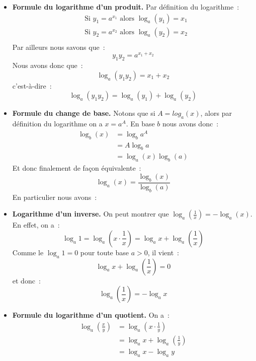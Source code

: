 \documentclass[10pt,notheorems]{beamer}
\theoremstyle{plain}
\theoremstyle{definition} %
\begin{document}
\begin{notes}

  \begin{itemize}

  \item \textbf{Formule du logarithme d'un produit.} Par définition du logarithme~:
    \begin{eqnarray*}
      &\text{Si } y_1 = a^{x_1} \text{ alors } \log_a(y_1) = x_1\\
      &\text{Si } y_2 = a^{x_2} \text{ alors } \log_a(y_2) = x_2\\
    \end{eqnarray*}
    Par ailleurs nous savons que~:
    \[
      y_1y_2 = a^{x_1+x_2}
    \]
    Nous avons donc que~:
    \[
      \log_a(y_1y_2) = x_1 + x_2
    \]
    c'est-à-dire~:
    \[
      \log_a(y_1y_2) = \log_a(y_1) + \log_a(y_2)
    \]

  \item \textbf{Formule du change de base.} Notons que si $A = log_a(x)$, alors par définition du logarithme on a $x = a^A$. En base $b$ nous avons donc~:
    \[
      \begin{split}
        \log_b(x) &= \log_b a^A\\
        &= A\log_b a\\
        &= \log_a(x)\log_b(a)
      \end{split}
    \]
    Et donc finalement de façon équivalente~:
    \[
      \log_a(x) = \frac{\log_b(x)}{\log_b(a)}
    \]
    En particulier nous avons~:

  \item \textbf{Logarithme d'un inverse.} On peut montrer que $\log_a \left(\frac{1}{x}\right) = - \log_a(x)$. En effet, on a~:
    \[
      \log_a1 = \log_a \left(x\cdot\frac{1}{x}\right) = \log_a x + \log_a \left(\frac{1}{x}\right)
    \]
    Comme le $\log_a 1 = 0$ pour toute base $a>0$, il vient~:
    \[
      \log_a x + \log_a \left(\frac{1}{x}\right) = 0
    \]
    et donc~:
    \[
      \log_a \left(\frac{1}{x}\right) = -\log_a x
    \]

  \item \textbf{Formule du logarithme d'un quotient.} On a~:
    \[
      \begin{split}
        \log_a \left(\frac{x}{y}\right) &= \log_a \left(x\cdot\frac{1}{y}\right)\\
        &= \log_a x + \log_a \left(\frac{1}{y}\right)\\
        &= \log_a x - \log_a y\\
      \end{split}
    \]

  \end{itemize}

\end{notes}
\end{document}

